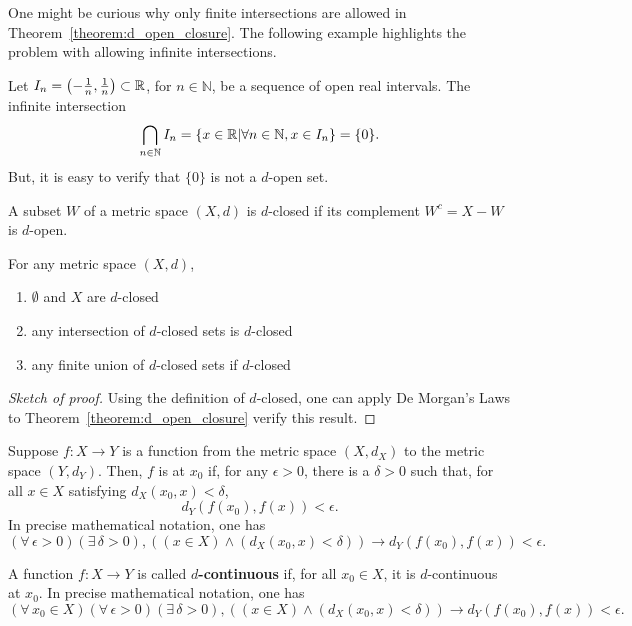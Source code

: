 One might be curious why only finite intersections are allowed in Theorem~\ref{theorem:d_open_closure}.
The following example highlights the problem with allowing infinite intersections.
\begin{example}
Let $I_n = \left(-\frac{1}{n},\frac{1}{n} \right) \subset \mathbb{R}$, for $n\in \mathbb{N}$, be a sequence of open real intervals.
The infinite intersection
\[ \bigcap_{n\in \mathbb{N}} I_n = \{ x\in \mathbb{R} | \forall n\in \mathbb{N}, x\in I_n \} = \{0 \}. \]
But, it is easy to verify that $\{ 0 \}$ is not a $d$-open set.
\end{example}

\begin{definition}
A subset $W$ of a metric space $(X,d)$ is $d$-closed if its complement $W^c = X-W$ is $d$-open.
\end{definition}

\begin{corollary}
For any metric space $(X,d)$,
\begin{enumerate}
\item $\emptyset$ and $X$ are $d$-closed
\item any intersection of $d$-closed sets is $d$-closed
\item any finite union of $d$-closed sets if $d$-closed
\end{enumerate}
\end{corollary}
\begin{proof}[Sketch of proof]
Using the definition of $d$-closed, one can apply De Morgan's Laws to Theorem~\ref{theorem:d_open_closure} verify this result.
\end{proof}

\begin{definition}
Suppose $f: X \rightarrow Y$ is a function from the metric space $(X,d_X)$ to the metric space $(Y,d_Y)$.
Then, $f$ is  at $x_0$ if, for any $\epsilon> 0$, there is a $\delta >0$ such that, for all $x\in X$ satisfying $d_X(x_0,x)< \delta$, 
\[ d_Y \left( f(x_0),f(x) \right) < \epsilon .\]
In precise mathematical notation, one has
\[ (\forall \, \epsilon >0) ( \exists \, \delta >0), \left( (x\in X) \wedge (d_X(x_0,x)< \delta) \right) \rightarrow  d_Y \left( f(x_0),f(x) \right) < \epsilon. \]
\end{definition}

\begin{definition}
A function $f : X \rightarrow Y$ is called \textbf{$d$-continuous} if, for all $x_0 \in X$, it is $d$-continuous at $x_0$.
In precise mathematical notation, one has
\[ (\forall \, x_0 \in X) (\forall \, \epsilon >0) ( \exists \, \delta >0), \left( (x\in X) \wedge (d_X(x_0,x)< \delta) \right) \rightarrow  d_Y \left( f(x_0),f(x) \right) < \epsilon. \]
\end{definition}

